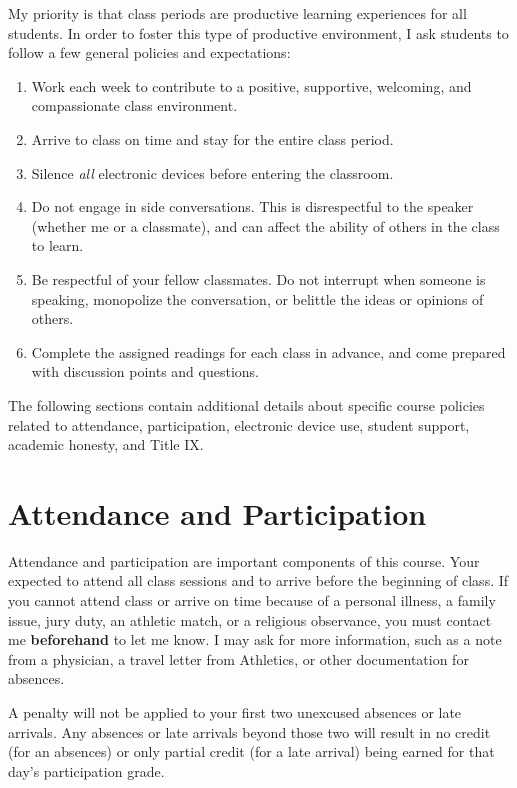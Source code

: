 \documentclass[]{book}
\providecommand{\tightlist}{%
  \setlength{\itemsep}{0pt}\setlength{\parskip}{0pt}}
\theoremstyle{definition}
\theoremstyle{definition}
\theoremstyle{definition}
\theoremstyle{remark}
\begin{document}
My priority is that class periods are productive learning experiences
for all students. In order to foster this type of productive
environment, I ask students to follow a few general policies and
expectations:

\begin{enumerate}
\def\labelenumi{\arabic{enumi}.}
\tightlist
\item
  Work each week to contribute to a positive, supportive, welcoming, and
  compassionate class environment.
\item
  Arrive to class on time and stay for the entire class period.
\item
  Silence \emph{all} electronic devices before entering the classroom.
\item
  Do not engage in side conversations. This is disrespectful to the
  speaker (whether me or a classmate), and can affect the ability of
  others in the class to learn.
\item
  Be respectful of your fellow classmates. Do not interrupt when someone
  is speaking, monopolize the conversation, or belittle the ideas or
  opinions of others.
\item
  Complete the assigned readings for each class in advance, and come
  prepared with discussion points and questions.
\end{enumerate}

The following sections contain additional details about specific course
policies related to attendance, participation, electronic device use,
student support, academic honesty, and Title IX.

\hypertarget{attendance-and-participation}{%
\section{Attendance and
Participation}\label{attendance-and-participation}}

Attendance and participation are important components of this course.
Your expected to attend all class sessions and to arrive before the
beginning of class. If you cannot attend class or arrive on time because
of a personal illness, a family issue, jury duty, an athletic match, or
a religious observance, you must contact me \textbf{beforehand} to let
me know. I may ask for more information, such as a note from a
physician, a travel letter from Athletics, or other documentation for
absences.

A penalty will not be applied to your first two unexcused absences or
late arrivals. Any absences or late arrivals beyond those two will
result in no credit (for an absences) or only partial credit (for a late
arrival) being earned for that day's participation grade.
\end{document}

